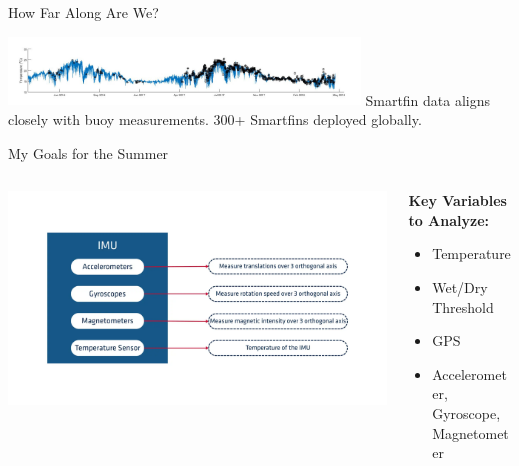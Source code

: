 \begin{frame}{How Far Along Are We?}
    \begin{center}
        \includegraphics[width=0.7\textwidth]{images/buoy_vs_smartfin_data.jpg}
        \centering
        \vspace{1em}
        \small Smartfin data aligns closely with buoy measurements. 300+ Smartfins deployed globally.
    \end{center}
\end{frame}
\begin{frame}{My Goals for the Summer}
    \begin{columns}[c]
        \begin{column}{0.45\textwidth}
            \centering
            \includegraphics[width=0.85\linewidth]{images/imu-diagram.png}
        \end{column}
        \begin{column}{0.55\textwidth}
            \small
            \textbf{Key Variables to Analyze:}
            \begin{itemize}
                \item Temperature
                \item Wet/Dry Threshold
                \item GPS
                \item Accelerometer, Gyroscope, Magnetometer
            \end{itemize}
        \vspace{1em}           
        \end{column}
    \end{columns}
\end{frame}
